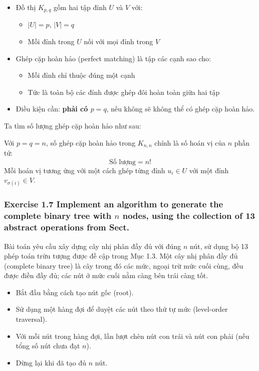 \documentclass{article}
\begin{document}
	\begin{itemize}
		\item Đồ thị $K_{p,q}$ gồm hai tập đỉnh $U$ và $V$ với:
		\begin{itemize}
			\item $|U| = p$, $|V| = q$
			\item Mỗi đỉnh trong $U$ nối với mọi đỉnh trong $V$
		\end{itemize}
		\item Ghép cặp hoàn hảo (perfect matching) là tập các cạnh sao cho:
		\begin{itemize}
			\item Mỗi đỉnh chỉ thuộc đúng một cạnh
			\item Tức là toàn bộ các đỉnh được ghép đôi hoàn toàn giữa hai tập
		\end{itemize}
		\item Điều kiện cần: \textbf{phải có $p = q$}, nếu không sẽ không thể có ghép cặp hoàn hảo.
	\end{itemize}
	
	Ta tìm số lượng ghép cặp hoàn hảo như sau:
	
	Với $p = q = n$, số ghép cặp hoàn hảo trong $K_{n,n}$ chính là số hoán vị của $n$ phần tử:
	\[
	\text{Số lượng} = n!
	\]
	Mỗi hoán vị tương ứng với một cách ghép từng đỉnh $u_i \in U$ với một đỉnh $v_{\sigma(i)} \in V$.
	
	\subsubsection*{Exercise 1.7 Implement an algorithm to generate the complete binary tree with $n$ nodes, using the collection of 13 abstract operations from Sect.}
	
	Bài toán yêu cầu xây dựng cây nhị phân đầy đủ với đúng $n$ nút, sử dụng bộ 13 phép toán trừu tượng được đề cập trong Mục 1.3. Một cây nhị phân đầy đủ (complete binary tree) là cây trong đó các mức, ngoại trừ mức cuối cùng, đều được điền đầy đủ; các nút ở mức cuối nằm càng bên trái càng tốt.
	
	\begin{itemize}
		\item Bắt đầu bằng cách tạo nút gốc (root).
		\item Sử dụng một hàng đợi để duyệt các nút theo thứ tự mức (level-order traversal).
		\item Với mỗi nút trong hàng đợi, lần lượt chèn nút con trái và nút con phải (nếu tổng số nút chưa đạt $n$).
		\item Dừng lại khi đã tạo đủ $n$ nút.
	\end{itemize}
	
\end{document}
